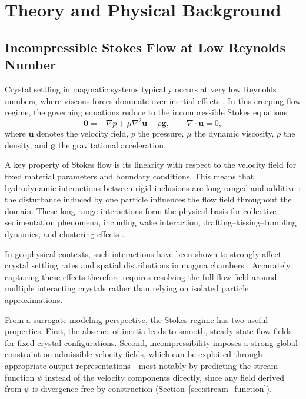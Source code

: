 \chapter{Theory and Physical Background}
\label{ch:theory}

\section{Incompressible Stokes Flow at Low Reynolds Number}
\label{sec:stokes_flow}

Crystal settling in magmatic systems typically occurs at very low Reynolds numbers, where viscous forces dominate over inertial effects \parencite{martin_crystal_1988,ladd_numerical_nodate}. In this creeping-flow regime, the governing equations reduce to the incompressible Stokes equations
\begin{equation}
\label{eq:stokes}
\mathbf{0} = -\nabla p + \mu \nabla^2 \mathbf{u} + \rho \mathbf{g},
\qquad
\nabla \cdot \mathbf{u} = 0,
\end{equation}
where $\mathbf{u}$ denotes the velocity field, $p$ the pressure, $\mu$ the
dynamic viscosity, $\rho$ the density, and $\mathbf{g}$ the gravitational
acceleration.

A key property of Stokes flow is its linearity with respect to the
velocity field for fixed material parameters and boundary conditions. This
means that hydrodynamic interactions between rigid inclusions are long-ranged
and additive \parencite{happel_low_1983}: the disturbance induced by one particle influences the
flow field throughout the domain. These long-range interactions form the
physical basis for collective sedimentation phenomena, including wake
interaction, drafting--kissing--tumbling dynamics, and clustering effects
\parencite{ladd_numerical_nodate,uhlmann_sedimentation_2014}.

In geophysical contexts, such interactions have been shown to strongly affect
crystal settling rates and spatial distributions in magma chambers
\parencite{martin_crystal_1988,weinstein_evolution_1988,martin_fluid-dynamical_1989}.
Accurately capturing these effects therefore requires resolving the full flow
field around multiple interacting crystals rather than relying on isolated
particle approximations.

From a surrogate modeling perspective, the Stokes regime has two useful properties. First, the absence of inertia leads to smooth, steady-state flow
fields for fixed crystal configurations. Second, incompressibility imposes a
strong global constraint on admissible velocity fields, which can be exploited
through appropriate output representations—most notably by predicting the
stream function $\psi$ instead of the velocity components directly, since any
field derived from $\psi$ is divergence-free by construction (Section~\ref{sec:stream_function}).

